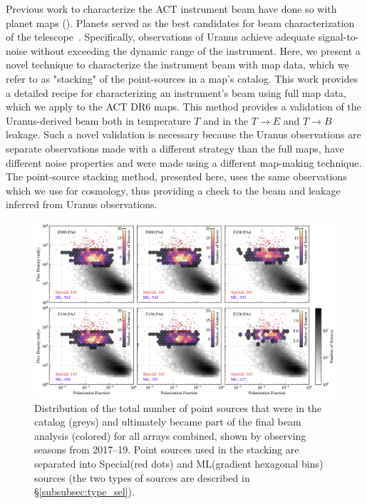 Previous work to characterize the ACT instrument beam have done so with planet maps (\cite{hasselfield_atacama_2013,louis_2017,naess_2014}).  Planets served as the best candidates for beam characterization of the telescope~\cite{Lungu_2022}.  Specifically, observations of Uranus achieve adequate signal-to-noise without exceeding the dynamic range of the instrument.  Here, we present a novel technique to characterize the instrument beam with map data, which we refer to as "stacking" of the point-sources in a map's catalog.  This work provides a detailed recipe for characterizing an instrument's beam using full map data, which we apply to the ACT DR6 maps.  This method provides a validation of the Uranus-derived beam both in temperature $T$ and in the $T\rightarrow E$ and $T\rightarrow B$ leakage.  Such a novel validation is necessary because the Uranus observations are separate observations made with a different strategy than the full maps, have different noise properties and were made using a different map-making technique.  The point-source stacking method, presented here, uses the same observations which we use for cosmology, thus providing a check to the beam and leakage inferred from Uranus observations.

\begin{figure}[t]
\vspace{1em}
    \centering
    \includegraphics[width=\linewidth]{Figures/pt_src_dist.png}
    \caption{Distribution of the total number of point sources that were in the catalog (greys) and ultimately became part of the final beam analysis (colored) for all arrays combined, shown by observing seasons from 2017--19.  Point sources used in the stacking are separated into Special(red dots) and ML(gradient hexagonal bins) sources (the two types of sources are described in \S\ref{subsubsec:type_sel}).
    }
    \label{fig:ptsrc_select}
    \vspace{1em}
\end{figure}

